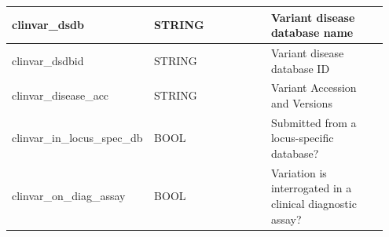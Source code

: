 \documentclass[letterpaper,10pt,english]{sphinxmanual}
\begin{document}
\begin{tabular}{|p{0.317\linewidth}|p{0.317\linewidth}|p{0.317\linewidth}|}
clinvar\_dsdb
 & 
STRING
 & 
Variant disease database name
\\\hline

clinvar\_dsdbid
 & 
STRING
 & 
Variant disease database ID
\\\hline

clinvar\_disease\_acc
 & 
STRING
 & 
Variant Accession and Versions
\\\hline

clinvar\_in\_locus\_spec\_db
 & 
BOOL
 & 
Submitted from a locus-specific database?
\\\hline

clinvar\_on\_diag\_assay
 & 
BOOL
 & 
Variation is interrogated in a clinical diagnostic assay?
\\\hline
\end{tabular}
\end{document}
